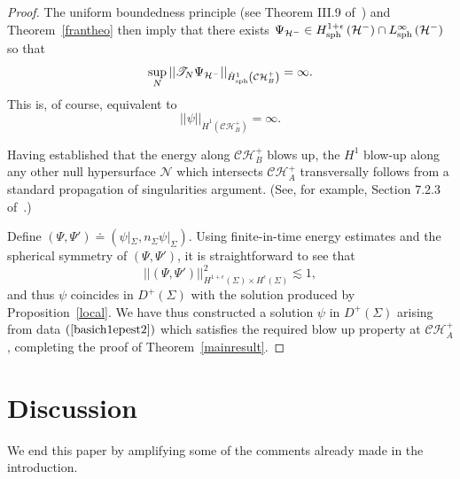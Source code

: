 \documentclass[A4,10pt]{article}
\begin{document}
\begin{proof}
The uniform boundedness principle (see Theorem III.9 of~\cite{ReedSimon}) and Theorem~\ref{frantheo} then imply that there exists $\Psi_{\mathcal{H}^-} \in H^{1+\epsilon}_{{\rm sph}}\left(\mathcal{H}^-\right) \cap L^{\infty}_{{\rm sph}}\left(\mathcal{H}^-\right)$ so that
\[\sup_N\left\vert\left\vert \mathscr{T}_N\Psi_{\mathcal{H}^-}\right\vert\right\vert_{\dot{H}^1_{{\rm sph}}\left(\mathcal{CH}^+_B\right)} = \infty.\]
This is, of course, equivalent to 
\[\left\vert\left\vert \psi\right\vert\right\vert_{\dot{H}^1\left(\mathcal{CH}^+_B\right)} = \infty.\]

Having established that the energy along $\mathcal{CH}^+_B$ blows up, the $H^1$ blow-up along any other null hypersurface $\mathcal{N}$ which intersects $\mathcal{CH}^+_A$ transversally follows from a standard propagation of singularities argument. (See, for example, Section 7.2.3 of~\cite{DafShlap}.)

Define $(\Psi,\Psi') \doteq \left(\psi|_{\Sigma},n_{\Sigma}\psi|_{\Sigma}\right)$. Using finite-in-time energy estimates and the spherical symmetry of $(\Psi,\Psi')$, it is straightforward to see that
\begin{equation}\label{basich1epest2}
\left\vert\left\vert (\Psi,\Psi') \right\vert\right\vert^2_{H^{1+\epsilon}\left(\Sigma\right) \times H^{\epsilon}\left(\Sigma\right)} \lesssim 1,
\end{equation}
and thus $\psi$ coincides in $D^+(\Sigma)$
with the solution produced by Proposition~\ref{local}.
We have thus constructed a solution $\psi$ in $D^+(\Sigma)$ 
arising from data $(\ref{basich1epest2})$
which satisfies the required blow up property at $\mathcal{CH}^+_A$,
completing the proof of Theorem~\ref{mainresult}.
\end{proof}

\section{Discussion}\label{discussionsec}

We end this paper by amplifying some of the comments already made in the introduction.
\end{document}
